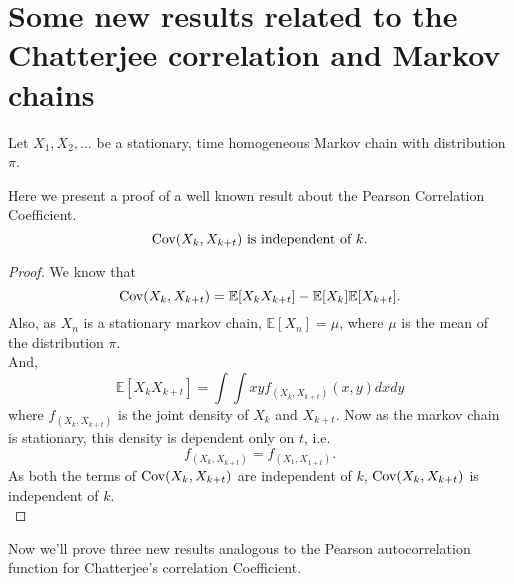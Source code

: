 \chapter{Some new results related to the Chatterjee correlation and Markov chains}

Let $X_1, X_2, \dots$ be a stationary, time homogeneous Markov chain with distribution $\pi$.
\begin{theorem}
    Here we present a proof of a well known result about the Pearson Correlation Coefficient.
    $$\text{Cov}(X_k, X_{k+t}) \text{ is independent of } k.$$
    \begin{proof}
        We know that
        $$\text{Cov}(X_k, X_{k+t}) = \mathbb{E}[X_k X_{k+t}] - \mathbb{E}[X_k]\mathbb{E}[X_{k+t}].$$
        Also, as $X_n$ is a stationary markov chain, $\mathbb{E}[X_n] = \mu$, where $\mu$ is the mean of the distribution $\pi$.\\
        And,
        $$\mathbb{E}[X_k X_{k+t}] = \int\int xyf_{(X_k, X_{k+t})}(x, y)dxdy$$
        where $f_{(X_k, X_{k+t})}$ is the joint density of $X_k$ and $X_{k+t}$. Now as the markov chain is stationary, this density is dependent only on $t$, i.e. $$f_{(X_k, X_{k+t})} = f_{(X_1, X_{1+t})}.$$
        As both the terms of $\text{Cov}(X_k, X_{k+t})$ are independent of $k$, $\text{Cov}(X_k, X_{k+t})$ is independent of $k$.\\
    \end{proof}
\end{theorem}

Now we'll prove three new results analogous to the Pearson autocorrelation function for Chatterjee's correlation Coefficient.

